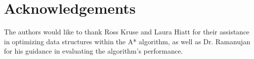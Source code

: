 
\section{Acknowledgements} 
\label{sec:ack} 

The authors would like to thank Ross Kruse and Laura Hiatt for their assistance in optimizing data structures within the A* algorithm, as well as Dr. Ramanujan for his guidance in evaluating the algorithm's performance.
